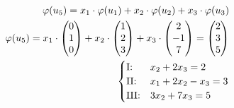\begin{align*}
    \varphi(u_5) = x_1 \cdot \varphi(u_1) + x_2 \cdot \varphi(u_2) + x_3 \cdot \varphi(u_3) \\
    \varphi(u_5) = x_1 \cdot \begin{pmatrix}
        0 \\ 1 \\ 0
    \end{pmatrix} + x_2 \cdot \begin{pmatrix}
        1 \\ 2 \\ 3
    \end{pmatrix} + x_3 \cdot \begin{pmatrix}
        2 \\ -1 \\ 7
    \end{pmatrix} = \begin{pmatrix}
        2 \\ 3 \\ 5
    \end{pmatrix} \\
    \begin{cases}
        \text{I:\@} & x_2 + 2x_3 = 2\\
        \text{II:\@} & x_1 + 2x_2 - x_3 = 3\\
        \text{III:\@} & 3x_2 + 7x_3 = 5 
    \end{cases}
\end{align*}

